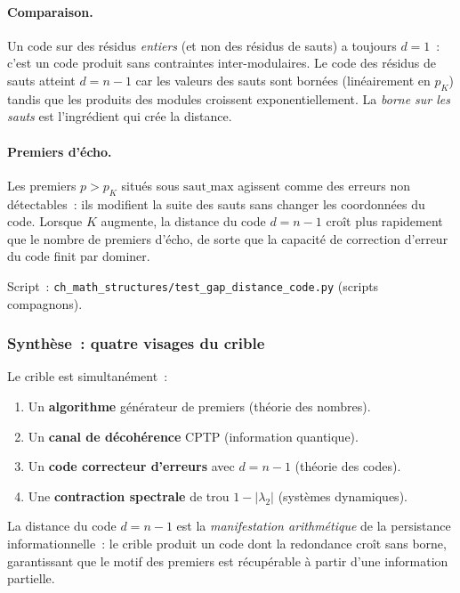 \documentclass[12pt,a4paper]{article}
\begin{document}
\paragraph{Comparaison.}
Un code sur des résidus \emph{entiers} (et non des résidus de sauts)
a toujours $d = 1$~: c'est un code produit sans contraintes
inter-modulaires. Le code des résidus de sauts atteint $d = n-1$ car
les valeurs des sauts sont bornées (linéairement en $p_K$) tandis que
les produits des modules croissent exponentiellement. La \emph{borne
sur les sauts} est l'ingrédient qui crée la distance.

\paragraph{Premiers d'écho.}
Les premiers $p > p_K$ situés sous $\mathrm{saut}\_\mathrm{max}$
agissent comme des erreurs non détectables~: ils modifient la suite
des sauts sans changer les coordonnées du code. Lorsque $K$ augmente,
la distance du code $d = n - 1$ croît plus rapidement que le nombre
de premiers d'écho, de sorte que la capacité de correction d'erreur
du code finit par dominer.

Script~:
\texttt{ch\_math\_structures/test\_gap\_distance\_code.py}
(scripts compagnons).

\subsubsection{Synthèse~: quatre visages du crible}

Le crible est simultanément~:
\begin{enumerate}[nosep]
\item Un \textbf{algorithme} générateur de premiers (théorie des
  nombres).
\item Un \textbf{canal de décohérence} CPTP (information quantique).
\item Un \textbf{code correcteur d'erreurs} avec $d = n - 1$ (théorie
  des codes).
\item Une \textbf{contraction spectrale} de trou $1 - |\lambda_2|$
  (systèmes dynamiques).
\end{enumerate}
La distance du code $d = n - 1$ est la \emph{manifestation
arithmétique} de la persistance informationnelle~: le crible produit
un code dont la redondance croît sans borne, garantissant que le
motif des premiers est récupérable à partir d'une information
partielle.


\end{document}
